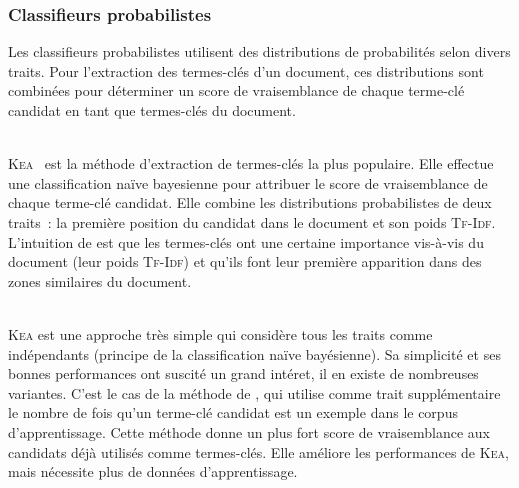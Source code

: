      \subsubsection{Classifieurs probabilistes}
      \label{subsubsec:main-state_of_the_art-automatic_keyphrase_extraction-supervised_keyphrase_extraction-probabilistic_models}
        Les classifieurs probabilistes utilisent des distributions de
        probabilités selon divers traits. Pour l'extraction des termes-clés d'un
        document, ces distributions sont combinées pour déterminer un score de
        vraisemblance de chaque terme-clé candidat en tant que termes-clés du
        document.

        ~\\\textsc{Kea}~\cite{witten1999kea} est la méthode d'extraction de
        termes-clés la plus populaire. Elle effectue une classification naïve
        bayesienne pour attribuer le score de vraisemblance de chaque terme-clé
        candidat. Elle combine les distributions probabilistes de deux traits~:
        la première position du candidat dans le document et son poids \textsc{Tf-Idf}.
        L'intuition de  est que les termes-clés ont une
        certaine importance vis-à-vis du document (leur poids \textsc{Tf-Idf}) et qu'ils
        font leur première apparition dans des zones similaires du document.

        ~\\\textsc{Kea} est une approche très simple qui considère tous les
        traits comme indépendants (principe de la classification naïve
        bayésienne). Sa simplicité et ses bonnes performances ont suscité un
        grand intéret, il en existe de nombreuses variantes. C'est le cas de la
        méthode de , qui utilise comme trait
        supplémentaire le nombre de fois qu'un terme-clé candidat est un exemple
        dans le corpus d'apprentissage. Cette méthode donne un plus fort score
        de vraisemblance aux candidats déjà utilisés comme termes-clés. Elle
        améliore les performances de \textsc{Kea}, mais nécessite plus de
        données d'apprentissage.
        
